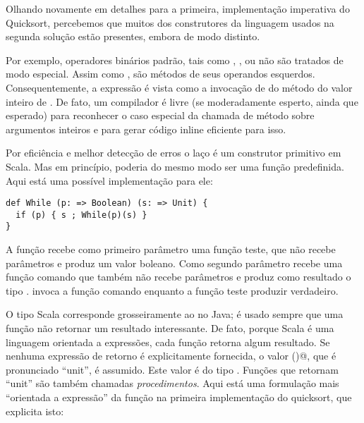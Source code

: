 Olhando novamente em detalhes para a primeira, implementa\c{c}\~{a}o imperativa
do Quicksort, percebemos que muitos dos construtores da linguagem 
usados na segunda solu\c{c}\~{a}o est\~{a}o presentes, embora de modo distinto.

Por exemplo, operadores bin\'{a}rios padr\~{a}o, tais como \code{+}, \code{-},
ou \code{<} n\~{a}o s\~{a}o tratados de modo especial. Assim como , 
s\~{a}o m\'{e}todos de seus operandos esquerdos. Consequentemente, a express\~{a}o 
 \'{e} vista como a invoca\c{c}\~{a}o de  do m\'{e}todo \code{+}      
do valor inteiro de . De fato, um compilador \'{e} livre (se 
moderadamente esperto, ainda que  esperado) para reconhecer o caso 
especial da chamada de m\'{e}todo \code{+} sobre argumentos inteiros e 
para gerar c\'{o}digo inline eficiente para isso.  

Por efici\^{e}ncia e melhor detec\c{c}\~{a}o de erros o la\c{c}o  \'{e} um construtor 
primitivo em Scala. Mas em princ\'{i}pio, poderia do mesmo modo ser uma fun\c{c}\~{a}o 
predefinida. Aqui est\'{a} uma poss\'{i}vel implementa\c{c}\~{a}o para ele: 

\begin{lstlisting}
def While (p: => Boolean) (s: => Unit) {
  if (p) { s ; While(p)(s) }
}
\end{lstlisting}


A fun\c{c}\~{a}o  recebe como primeiro par\^{a}metro uma fun\c{c}\~{a}o teste,
que n\~{a}o recebe par\^{a}metros e produz um valor boleano. Como segundo par\^{a}metro 
recebe uma fun\c{c}\~{a}o comando que tamb\'{e}m n\~{a}o recebe par\^{a}metros e produz como 
resultado o tipo  \lstinline@Unit@.  invoca a fun\c{c}\~{a}o comando
enquanto a fun\c{c}\~{a}o teste produzir verdadeiro.

O tipo Scala \lstinline@Unit@ corresponde grosseiramente ao \lstinline@void@
no Java; \'{e} usado sempre que uma fun\c{c}\~{a}o n\~{a}o retornar um resultado interessante.
De fato, porque Scala \'{e} uma linguagem orientada a express\~{o}es, cada fun\c{c}\~{a}o 
retorna algum resultado. Se nenhuma express\~{a}o de retorno \'{e}  explicitamente
fornecida, o valor \lstinline@()@, que \'{e} pronunciado ``unit'', \'{e} assumido.
Este valor \'{e} do tipo \lstinline@Unit@. Fun\c{c}\~{o}es que retornam ``unit'' s\~{a}o 
tamb\'{e}m chamadas {\em procedimentos}. Aqui est\'{a} uma formula\c{c}\~{a}o mais 
``orientada a express\~{a}o'' da fun\c{c}\~{a}o \lstinline@swap@ na primeira implementa\c{c}\~{a}o
do quicksort, que explicita isto:

